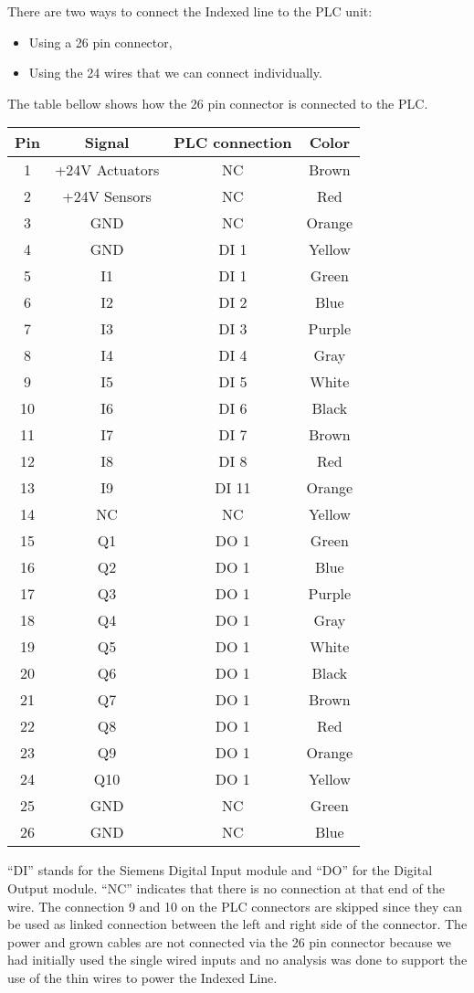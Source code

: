 
There are two ways to connect the Indexed line to the PLC unit:
\begin{itemize}
  \item Using a 26 pin connector,
  \item Using the 24 wires that we can connect individually.
\end{itemize}
The table bellow shows how the 26 pin connector is connected to the PLC.

\begin{center}
\begin{tabular}{ |c|c|c|c| } 
 \hline
 Pin & Signal & PLC connection & Color \\ 
 \hline
  1 & +24V Actuators & NC & Brown \\ 
  2 & +24V Sensors & NC & Red \\ 
  3 & GND & NC & Orange \\ 
  4 & GND & DI 1 & Yellow \\ 
  5 & I1 & DI 1 & Green \\ 
  6 & I2 & DI 2 & Blue \\ 
  7 & I3 & DI 3 & Purple \\ 
  8 & I4 & DI 4 & Gray \\ 
  9 & I5 & DI 5 & White \\ 
  10 & I6 & DI 6 & Black \\ 
  11 & I7 & DI 7 & Brown \\ 
  12 & I8 & DI 8 & Red \\ 
  13 & I9 & DI 11 & Orange \\ 
  14 & NC & NC & Yellow \\ 
  15 & Q1 & DO 1 & Green \\ 
  16 & Q2& DO 1 & Blue \\ 
  17 & Q3 & DO 1 & Purple \\ 
  18 & Q4 & DO 1 & Gray \\ 
  19 & Q5 & DO 1 & White \\ 
  20 & Q6 & DO 1 & Black \\ 
  21 & Q7 & DO 1 & Brown \\ 
  22 & Q8 & DO 1 & Red \\ 
  23 & Q9 & DO 1 & Orange \\ 
  24 & Q10 & DO 1 & Yellow \\ 
  25 & GND & NC & Green \\ 
  26 & GND & NC & Blue \\ 
\hline
\end{tabular}
\end{center}

``DI'' stands for the Siemens Digital Input module and ``DO'' for the Digital Output module.
``NC'' indicates that there is no connection at that end of the wire.
The connection 9 and 10 on the PLC connectors are skipped since they can be used as linked connection between the left and right side of the connector.
The power and grown cables are not connected via the 26 pin connector because we had initially used the single wired inputs and no analysis was done to support the use of the thin wires to power the Indexed Line.